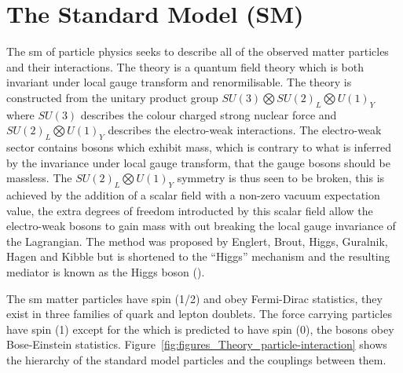 \section{The Standard Model (SM)} %
\label{sec:the_standard_model_sm_}

The \ac{sm} of particle physics seeks to describe all of the observed matter particles and their interactions. The theory is a quantum field theory which is both invariant under local gauge transform and renormilisable. The theory is constructed from the unitary product group $SU(3)\bigotimes SU(2)_{L} \bigotimes U(1)_{Y}$ where $SU(3)$ describes the colour charged strong nuclear force and $SU(2)_{L} \bigotimes U(1)_{Y}$ describes the electro-weak interactions. The electro-weak sector contains bosons which exhibit mass, which is contrary to what is inferred by the invariance under local gauge transform, that the gauge bosons should be massless. The $SU(2)_{L} \bigotimes U(1)_{Y}$ symmetry is thus seen to be broken, this is achieved by the addition of a scalar field with a non-zero vacuum expectation value, the extra degrees of freedom introducted by this scalar field allow the electro-weak bosons to gain mass with out breaking the local gauge invariance of the Lagrangian. The method was proposed by Englert, Brout, Higgs, Guralnik, Hagen and Kibble \cite{} but is shortened to the ``Higgs'' mechanism and the resulting mediator is known as the Higgs boson (\PHiggs).

The \ac{sm} matter particles have spin (1/2) and obey Fermi-Dirac statistics, they exist in three families of quark and lepton doublets. The force carrying particles have spin (1) except for the \PHiggs which is predicted to have spin (0), the bosons obey Bose-Einstein statistics. Figure~\ref{fig:figures_Theory_particle-interaction} shows the hierarchy of the standard model particles and the couplings between them.

